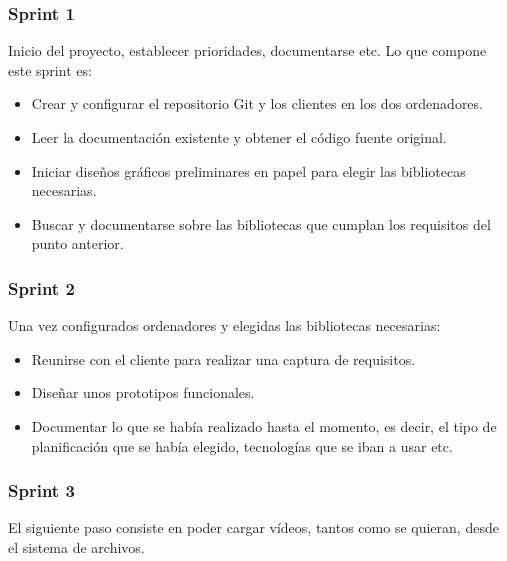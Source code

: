 \subsubsection{Sprint 1}
Inicio del proyecto, establecer prioridades, documentarse etc. Lo que compone este sprint es:

\begin{itemize}
    \item Crear y configurar el repositorio Git y los clientes en los dos ordenadores.
    \item Leer la documentaci\'{o}n existente y obtener el c\'{o}digo fuente original.
    \item Iniciar dise\~{n}os gr\'{a}ficos preliminares en papel para elegir las bibliotecas necesarias.
    \item Buscar y documentarse sobre las bibliotecas que cumplan los requisitos del punto anterior. 
\end{itemize} 

\subsubsection{Sprint 2}
Una vez configurados ordenadores y elegidas las bibliotecas necesarias:

\begin{itemize}
    \item Reunirse con el cliente para realizar una captura de requisitos.
    \item Dise\~{n}ar unos prototipos funcionales.
    \item Documentar lo que se hab\'{i}a realizado hasta el momento, es decir, el tipo de planificaci\'{o}n que se hab\'{i}a elegido,
    tecnolog\'{i}as que se iban a usar etc.
\end{itemize}

\subsubsection{Sprint 3}
El siguiente paso consiste en poder cargar v\'{i}deos, tantos como se quieran, desde el sistema de archivos.

